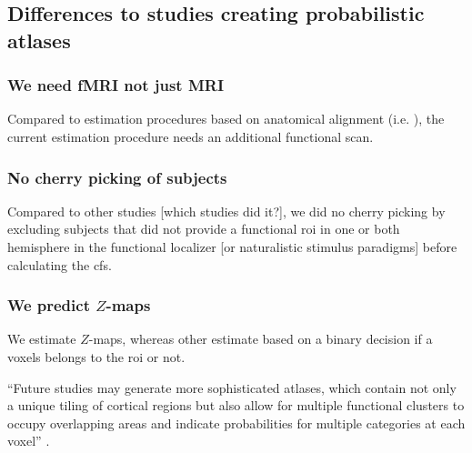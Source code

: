 \subsection{Differences to studies creating probabilistic atlases}


\subsubsection{We need fMRI not just MRI}

%
Compared to estimation procedures based on anatomical alignment (i.e.
\citep{weiner2018defining}), the current estimation procedure needs an
additional functional scan.


\subsubsection{No cherry picking of subjects}


%
Compared to other studies [which studies did it?], we did no cherry picking by
excluding subjects that did not provide a functional \ac{roi} in one or both
hemisphere in the functional localizer [or naturalistic stimulus paradigms]
before calculating the \ac{cfs}.

\subsubsection{We predict $Z$-maps}


We estimate $Z$-maps, whereas other estimate based on a binary decision if a
voxels belongs to the \ac{roi} or not.

%
``Future studies may generate more sophisticated atlases, which contain not only
a unique tiling of cortical regions but also allow for multiple functional
clusters to occupy overlapping areas and indicate probabilities for multiple
categories at each voxel'' \citep{rosenke2021probabilistic}.





